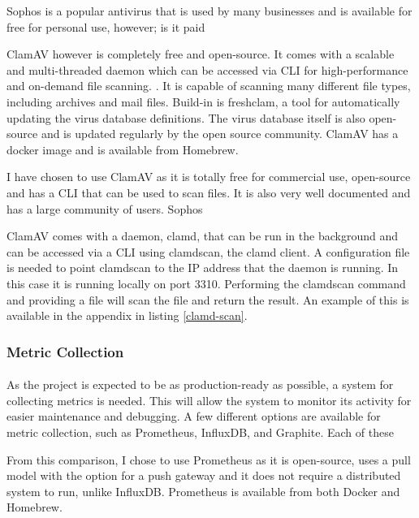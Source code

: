 \documentclass[12pt, conference, final, a4paper, onecolumn, compsoc]{IEEEtran}
\begin{document}
Sophos is a popular antivirus that is used by many businesses and is available
for free for personal use, however; is it paid %

ClamAV however is completely free and open-source. It comes with a scalable and
multi-threaded daemon which can be accessed via CLI for high-performance and
on-demand file scanning. \citep{clamav}. It is capable of scanning many
different file types, including archives and mail files. Build-in is freshclam,
a tool for automatically updating the virus database definitions. The virus
database itself is also open-source and is updated regularly by the open source
community. ClamAV has a docker image and is available from Homebrew.

I have chosen to use ClamAV as it is totally free for commercial use,
open-source and has a CLI that can be used to scan files. It is also very well
documented and has a large community of users. Sophos

ClamAV comes with a daemon, clamd, that can be run in the background and can be
accessed via a CLI using clamdscan, the clamd client. A configuration file is
needed to point clamdscan to the IP address that the daemon is running. In this
case it is running locally on port 3310. Performing the clamdscan command and
providing a file will scan the file and return the result. An example of this is
available in the appendix in listing \ref{clamd-scan}.


\subsubsection*{Metric Collection}
\paragraph{}

As the project is expected to be as production-ready as possible, a system for
collecting metrics is needed. This will allow the system to monitor its activity
for easier maintenance and debugging. A few different options are available for
metric collection, such as Prometheus, InfluxDB, and Graphite. Each of these



From this comparison, I chose to use Prometheus as it is open-source, uses a
pull model with the option for a push gateway and it does not require a
distributed system to run, unlike InfluxDB. Prometheus is available from both
Docker and Homebrew.
\end{document}
